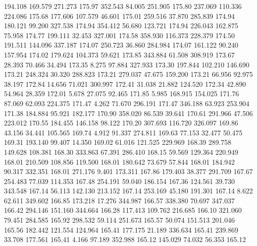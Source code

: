  194.108  169.579  271.273       175.97
 352.543   84.005  251.905       175.80
 237.069  110.336  224.086       175.68
 177.606  107.579   46.601       175.01
 259.516   37.870  285.839       174.94
 180.121   99.200  327.538       174.94
 354.412   56.680  123.721       174.94
 226.043  162.875   75.958       174.77
 199.111   32.453  327.001       174.58
 358.930  116.373  228.379       174.50
 191.511  144.096  337.187       174.07
 250.723   36.860  284.984       174.07
 161.122   90.240  157.954       174.02
 179.624  104.373   59.621       173.85
 343.884   61.508  308.919       173.67
  28.393   70.466   34.494       173.35
   8.275   97.884  327.933       173.30
 197.844  102.210  146.690       173.21
 248.324   30.320  288.823       173.21
 279.037   47.675  159.200       173.21
  66.956   92.975   38.197       172.84
  14.656   71.021  300.997       172.41
  31.038   21.882  124.520       172.34
  42.890   54.964   28.359       172.01
   5.678   27.075   92.465       171.85
   5.985  168.915  154.025       171.76
  87.069   62.093  224.375       171.47
   4.262   71.670  296.191       171.47
 346.188   63.923  253.904       171.38
 184.884   95.921  182.177       170.90
 358.020   86.539   39.641       170.61
 291.966   47.506  223.012       170.55
 184.455  146.158   98.122       170.20
 307.693  116.720  326.097       169.86
  43.156   34.441  105.565       169.74
   4.912   91.337  274.811       169.63
  77.153   32.477   50.475       169.31
 193.140   99.407   14.350       169.02
  61.016  121.525  229.969       168.39
 289.758  149.628  108.381       168.30
 333.863   67.391  286.410       168.15
  59.569  129.364  220.949       168.01
 210.509  108.856  119.500       168.01
 180.642   73.679   57.844       168.01
 184.942   90.317  332.351       168.01
 271.176    9.401  173.311       167.86
 179.403   38.377  291.709       167.67
 254.483   77.039  114.353       167.48
 254.191   59.040  186.154       167.36
 124.561   39.730  343.548       167.14
  56.113  142.130  213.152       167.14
 253.169   45.180  191.301       167.14
   8.622   62.611  349.602       166.85
 173.218   17.276  344.987       166.57
 338.380   70.697  347.037       166.42
 294.146  151.160  344.664       166.28
 117.413  109.762  216.685       166.10
 321.060   79.451  284.585       165.92
 298.532   59.114  251.673       165.57
  50.074  151.513  201.046       165.56
 182.442  121.554  124.964       165.41
 177.175   21.189  336.634       165.41
 239.869   33.708  177.561       165.41
   4.166   97.189  352.988       165.12
 145.029   74.032   56.353       165.12
